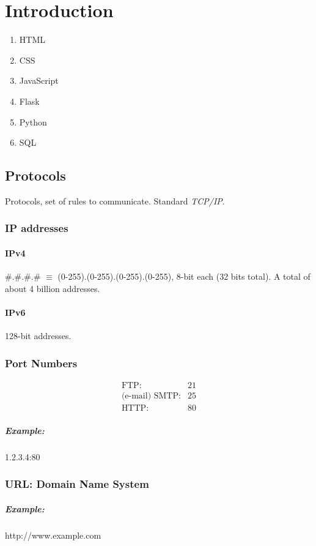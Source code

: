 \chapter{Introduction}
\begin{enumerate}
	\item HTML
	\item CSS
	\item JavaScript
	\item Flask
	\item Python
	\item SQL
\end{enumerate}

\section{Protocols}
Protocols, set of rules to communicate. Standard \emph{TCP/IP}.

\subsection{IP addresses}
\subsubsection{IPv4}
\#.\#.\#.\# $\equiv$ (0-255).(0-255).(0-255).(0-255), 8-bit each (32 bits total).
A total of about 4 billion addresses.
\subsubsection{IPv6}
128-bit addresses.

\subsection{Port Numbers}
\begin{align*}
	\text{FTP} :{}           & 21 \\
	\text{(e-mail) SMTP} :{} & 25 \\
	\text{HTTP} :{}          & 80
\end{align*}
\paragraph{Example:} 1.2.3.4:80

\subsection{URL: Domain Name System}
\paragraph{Example:} http://www.example.com

